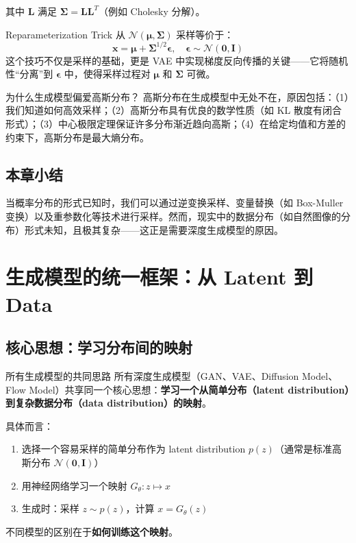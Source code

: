 \documentclass[a4paper]{article}
\begin{document}
其中 $\mathbf{L}$ 满足 $\boldsymbol{\Sigma} = \mathbf{L}\mathbf{L}^T$（例如 Cholesky 分解）。

\begin{importantbox}{Reparameterization Trick}
从 $\mathcal{N}(\boldsymbol{\mu}, \boldsymbol{\Sigma})$ 采样等价于：
$$\mathbf{x} = \boldsymbol{\mu} + \boldsymbol{\Sigma}^{1/2} \boldsymbol{\epsilon}, \quad \boldsymbol{\epsilon} \sim \mathcal{N}(\mathbf{0}, \mathbf{I})$$
这个技巧不仅是采样的基础，更是 VAE 中实现梯度反向传播的关键——它将随机性``分离''到 $\boldsymbol{\epsilon}$ 中，使得采样过程对 $\boldsymbol{\mu}$ 和 $\boldsymbol{\Sigma}$ 可微。
\end{importantbox}

\begin{knowledgebox}{为什么生成模型偏爱高斯分布？}
高斯分布在生成模型中无处不在，原因包括：（1）我们知道如何高效采样；（2）高斯分布具有优良的数学性质（如 KL 散度有闭合形式）；（3）中心极限定理保证许多分布渐近趋向高斯；（4）在给定均值和方差的约束下，高斯分布是最大熵分布。
\end{knowledgebox}

\subsection{本章小结}

当概率分布的形式已知时，我们可以通过逆变换采样、变量替换（如 Box-Muller 变换）以及重参数化等技术进行采样。然而，现实中的数据分布（如自然图像的分布）形式未知，且极其复杂——这正是需要深度生成模型的原因。

\newpage
\section{生成模型的统一框架：从 Latent 到 Data}

\subsection{核心思想：学习分布间的映射}

\begin{importantbox}{所有生成模型的共同思路}
所有深度生成模型（GAN、VAE、Diffusion Model、Flow Model）共享同一个核心思想：\textbf{学习一个从简单分布（latent distribution）到复杂数据分布（data distribution）的映射}。

具体而言：
\begin{enumerate}
    \item 选择一个容易采样的简单分布作为 latent distribution $p(z)$（通常是标准高斯分布 $\mathcal{N}(\mathbf{0}, \mathbf{I})$）
    \item 用神经网络学习一个映射 $G_\theta: z \mapsto x$
    \item 生成时：采样 $z \sim p(z)$，计算 $x = G_\theta(z)$
\end{enumerate}
不同模型的区别在于\textbf{如何训练这个映射}。
\end{importantbox}
\end{document}

